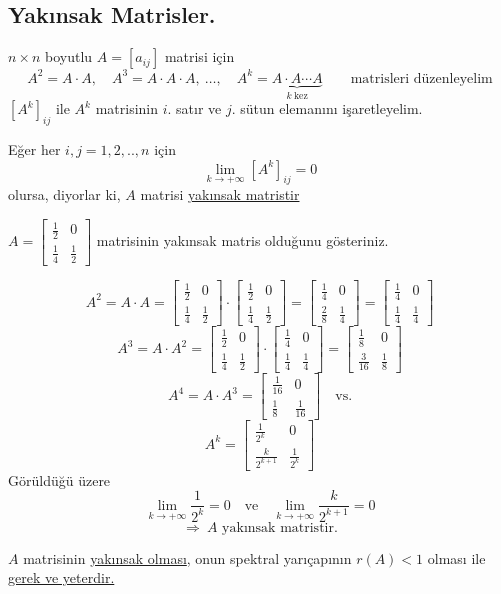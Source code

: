 \documentclass[11pt,a4paper]{article}
\begin{document}
\subsection{Yakınsak Matrisler.}
$n\times n$ boyutlu $A=[a_{ij}]$ matrisi için
\[
  A^2=A\cdot A,\quad A^3=A\cdot A\cdot A,\ \dots,\quad
  A^k=\underbrace{A\cdot A\cdots A}_{k\ \text{kez}}
  \qquad \text{matrisleri düzenleyelim}
\]
$[A^k]_{ij}$ ile $A^k$ matrisinin $i$. satır ve $j$. sütun elemanını işaretleyelim.

Eğer her $i,j=1,2,..,n$ için
\[ \lim_{k\to+\infty}[A^k]_{ij}=0 \]
olursa, diyorlar ki, $A$ matrisi \underline{yakınsak matristir}

\begin{ornek}[2]
$A=\begin{bmatrix}\frac12&0\\[1mm]\frac14&\frac12\end{bmatrix}$ matrisinin yakınsak matris olduğunu gösteriniz.
\end{ornek}
\begin{cozum}
\[
  A^2=A\cdot A=\begin{bmatrix}\frac12&0\\[1mm]\frac14&\frac12\end{bmatrix}\cdot\begin{bmatrix}\frac12&0\\[1mm]\frac14&\frac12\end{bmatrix}
  =\begin{bmatrix}\frac14&0\\[1mm]\frac28&\frac14\end{bmatrix}
  =\begin{bmatrix}\frac14&0\\[1mm]\frac14&\frac14\end{bmatrix}
\]
\[
  A^3=A\cdot A^2=\begin{bmatrix}\frac12&0\\[1mm]\frac14&\frac12\end{bmatrix}\cdot\begin{bmatrix}\frac14&0\\[1mm]\frac14&\frac14\end{bmatrix}
  =\begin{bmatrix}\frac18&0\\[1mm]\frac{3}{16}&\frac18\end{bmatrix}
\]
\[
  A^4=A\cdot A^3=\begin{bmatrix}\frac{1}{16}&0\\[1mm]\frac18&\frac{1}{16}\end{bmatrix}\quad\text{vs.}
\]
\[
  A^k=\begin{bmatrix}\frac{1}{2^k}&0\\[1mm]\frac{k}{2^{k+1}}&\frac{1}{2^k}\end{bmatrix}
\]
Görüldüğü üzere
\[
  \lim_{k\to+\infty}\frac{1}{2^k}=0 \quad\text{ve}\quad \lim_{k\to+\infty}\frac{k}{2^{k+1}}=0
\]
\[ \Rightarrow\ A \text{ yakınsak matristir.} \]
\end{cozum}
$A$ matrisinin \underline{yakınsak olması}, onun spektral yarıçapının
\underline{$r(A)<1$} olması ile \underline{gerek ve yeterdir.}
\end{document}
